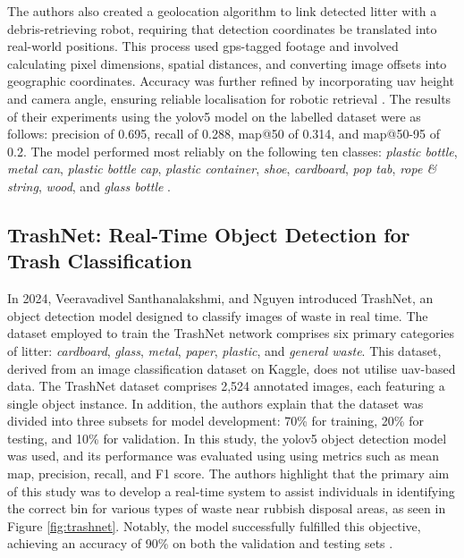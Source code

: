 The authors also created a geolocation algorithm to link detected litter with a debris-retrieving robot, requiring that detection coordinates be translated into real-world positions. This process used \gls{gps}-tagged footage and involved calculating pixel dimensions, spatial distances, and converting image offsets into geographic coordinates. Accuracy was further refined by incorporating \gls{uav} height and camera angle, ensuring reliable localisation for robotic retrieval \cite{beach_litter}.
The results of their experiments using the \gls{yolo}v5 model on the labelled dataset were as follows: precision of 0.695, recall of 0.288, \gls{map}@50 of 0.314, and \gls{map}@50-95 of 0.2. The model performed most reliably on the following ten classes: \textit{plastic bottle}, \textit{metal can}, \textit{plastic bottle} \textit{cap}, \textit{plastic container}, \textit{shoe}, \textit{cardboard}, \textit{pop tab}, \textit{rope \& string}, \textit{wood}, and \textit{glass bottle} \cite{beach_litter}.

\subsection{TrashNet: Real-Time Object Detection for Trash Classification}
\label{subsec:3_trashnet}

In 2024, Veeravadivel Santhanalakshmi, and Nguyen introduced TrashNet, an object detection model designed to classify images of waste in real time. The dataset employed to train the TrashNet network comprises six primary categories of litter: \textit{cardboard}, \textit{glass}, \textit{metal}, \textit{paper}, \textit{plastic}, and \textit{general waste}. This dataset, derived from an image classification dataset on Kaggle, does not utilise \gls{uav}-based data. The TrashNet dataset comprises 2,524 annotated images, each featuring a single object instance. In addition, the authors explain that the dataset was divided into three subsets for model development: 70\% for training, 20\% for testing, and 10\% for validation.
In this study, the \gls{yolo}v5 object detection model was used, and its performance was evaluated using using metrics such as mean \gls{map}, precision, recall, and F1 score. 
The authors highlight that the primary aim of this study was to develop a real-time system to assist individuals in identifying the correct bin for various types of waste near rubbish disposal areas, as seen in Figure \ref{fig:trashnet}. Notably, the model successfully fulfilled this objective, achieving an accuracy of 90\% on both the validation and testing sets \cite{trashnet}.

